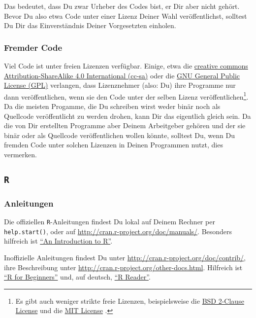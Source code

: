 \documentclass[twoside]{scrartcl}
\providecommand{\R}{\texttt{R}}
\providecommand{\code}[1]{\texttt{#1}}
\begin{document}
Das bedeutet, dass Du zwar Urheber des Codes bist, er Dir aber nicht
geh\"o{}rt. Bevor Du also etwa Code unter einer Lizenz Deiner Wahl
ver\"o{}ffentlichst, solltest Du Dir das Einverst\"a{}ndnis Deiner Vorgesetzten 
einholen.

\subsubsection{Fremder Code\label{sec:copy_foreign}}
Viel Code ist unter freien Lizenzen verf\"u{}gbar. Einige, etwa die
\href{https://creativecommons.org/licenses/by-sa/4.0/legalcode}{creative commons
Attribution-ShareAlike 4.0 International (cc-sa)} oder die
\href{http://www.gnu.org/licenses/gpl-3.0.html}{GNU General Public License
(GPL)} verlangen, dass Lizenznehmer (also: Du) ihre Programme nur dann
ver\"o{}ffentlichen, wenn sie den Code unter der selben Lizenz
ver\"o{}ffentlichen\footnote{Es gibt auch weniger strikte freie Lizenzen,
beispielsweise die 
\href{http://opensource.org/licenses/BSD-2-Clause}{BSD 2-Clause License} und
die 
\href{http://opensource.org/licenses/MIT}{MIT License}%
. }.
Da die meisten Progamme, die Du schreiben wirst weder bin\"a{}r noch als
Quellcode ver\"o{}ffentlicht zu werden drohen, kann Dir das eigentlich gleich 
sein.
Da die von Dir erstellten Programme aber Deinem Arbeitgeber geh\"o{}ren und der
sie bin\"a{}r oder als Quellcode ver\"o{}ffentlichen wollen  k\"o{}nnte, 
solltest Du, wenn Du fremden Code unter solchen Lizenzen in Deinen Programmen
nutzt, dies vermerken.
\subsection{\R{}}
\subsubsection{Anleitungen }
Die offiziellen  \R{}-Anleitungen findest Du lokal auf Deinem Rechner per 
\code{help.start()}, oder auf \url{http://cran.r-project.org/doc/manuals/}.
Besonders hilfreich ist 
\href{http://cran.r-project.org/doc/manuals/r-release/R-intro.pdf}
{"`An Introduction to R"'}.

Inoffizielle Anleitungen findest Du unter 
\url{http://cran.r-project.org/doc/contrib/}, ihre Beschreibung unter 
\url{http://cran.r-project.org/other-docs.html}. Hilfreich ist 
\href{http://cran.r-project.org/doc/contrib/Paradis-rdebuts_en.pdf}
{"`R for Beginners"'} 
und, auf deutsch, 
\href{http://cran.r-project.org/doc/contrib/Grosz+Peters-R-Reader.pdf}
{"`R Reader"'}.
\end{document}
